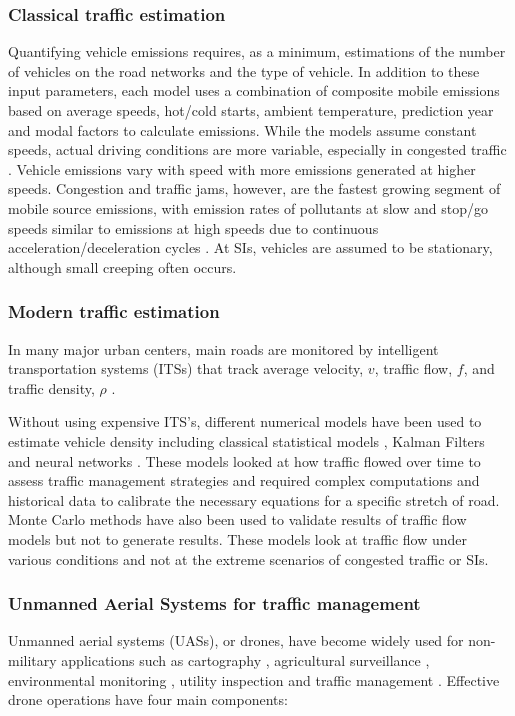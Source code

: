 \documentclass[preprint,12pt,a4paper]{elsarticle}
\begin{document}
\begin{linenumbers}
\subsubsection{Classical traffic estimation} \label{sssec:ClassicalTraffic}

Quantifying vehicle emissions requires, as a minimum, estimations of the number of vehicles on the road networks and the type of vehicle. In addition to these input parameters, each model uses a combination of composite mobile emissions based on average speeds, hot/cold starts, ambient temperature, prediction year and modal factors to calculate emissions\citep{Franco2013}. While the models assume constant speeds, actual driving conditions are more variable, especially in congested traffic \citep{Freeman2015b}. Vehicle emissions vary with speed with more emissions generated at higher speeds. Congestion and traffic jams, however, are the fastest growing segment of mobile source emissions, with emission rates of pollutants at slow and stop/go speeds similar to emissions at high speeds due to continuous acceleration/deceleration cycles \citep{Barth2009}. At SIs, vehicles are assumed to be stationary, although small creeping often occurs.

\subsubsection{Modern traffic estimation}

In many major urban centers, main roads are monitored by intelligent transportation systems (ITSs) that track average velocity, $v$, traffic flow, $f$, and traffic density, $\rho$ \citep{Wu2007, Abtahi2011, Bartosz2015}.

Without using expensive ITS's, different numerical models have been used to estimate vehicle density including classical statistical models \citep{Schreckenberg1995}, Kalman Filters \citep{Pourmoallem1997, Sun2004} and neural networks \citep{Ghosh-Dastidar2006}.  These models looked at how traffic flowed over time to assess traffic management strategies and required complex computations and historical data to calibrate the necessary equations for a specific stretch of road.  Monte Carlo methods have also been used to validate results of traffic flow models \citep{Mihaylova2004} but not to generate results.  These models look at traffic flow under various conditions and not at the extreme scenarios of congested traffic or SIs. 

\subsubsection{Unmanned Aerial Systems for traffic management} 
Unmanned aerial systems (UASs), or drones, have become widely used for non-military applications such as cartography \citep{Saadatseresht2015}, agricultural surveillance \citep{Saari2017}, environmental monitoring \citep{Capolupo2015}, utility inspection \citep{Day2017, Gomez2017} and traffic management \citep{Ahmadi2017,  Salvo2017, Liu2013}.  Effective drone operations have four main components:


\end{linenumbers}
\end{document}
